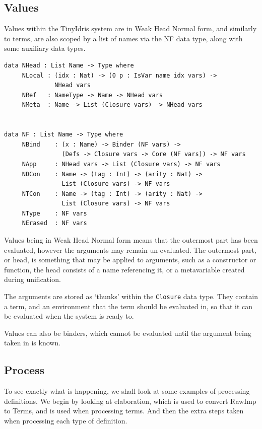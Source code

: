 \documentclass[a4paper]{article}
\begin{document}
\subsection{Values}
\label{sec:org3d64566}
Values within the TinyIdris system are in Weak Head Normal form, and 
similarly to terms, are also scoped by a list of names via the NF data
type, along with some auxiliary data types. 

\begin{center}
\begin{verbatim}
data NHead : List Name -> Type where
	 NLocal : (idx : Nat) -> (0 p : IsVar name idx vars) ->
			  NHead vars
	 NRef   : NameType -> Name -> NHead vars
	 NMeta  : Name -> List (Closure vars) -> NHead vars


data NF : List Name -> Type where
	 NBind    : (x : Name) -> Binder (NF vars) ->
				(Defs -> Closure vars -> Core (NF vars)) -> NF vars
	 NApp     : NHead vars -> List (Closure vars) -> NF vars
	 NDCon    : Name -> (tag : Int) -> (arity : Nat) ->
				List (Closure vars) -> NF vars
	 NTCon    : Name -> (tag : Int) -> (arity : Nat) ->
				List (Closure vars) -> NF vars
	 NType    : NF vars
	 NErased  : NF vars
\end{verbatim}
\end{center}

Values being in Weak Head Normal form means that the outermost part has 
been evaluated, however the arguments may remain un-evaluated. The 
outermost part, or head, is something that may be applied to arguments, 
such as a constructor or function, the head consists of a
name referencing it, or a metavariable created during unification. 

The arguments are stored as `thunks' within the \texttt{Closure} data type.  
They contain a term, and an environment that the term should be evaluated 
in, so that it can be evaluated when the system is ready to. 

Values can also be binders, which cannot be evaluated until the argument
being taken in is known. 

\subsection{Process}
\label{sec:orgecfa1fe}
To see exactly what is happening, we shall look at some examples of 
processing definitions. We begin by looking at elaboration, which is 
used to convert RawImp to Terms, and is used when processing terms. 
And then the extra steps taken when processing each type of definition. 
\end{document}
